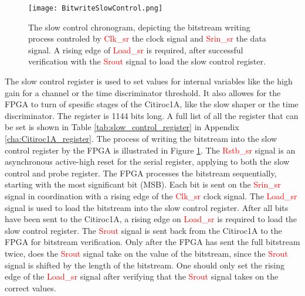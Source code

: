 \begin{figure}
    \centering
    \texttt{[image: BitwriteSlowControl.png]}
    \caption{The slow control chronogram, depicting the bitstream writing process controled by  \textcolor{red}{Clk\_sr} the clock signal and  \textcolor{red}{Srin\_sr} the data signal. A rising edge of \textcolor{red}{Load\_sr} is required,
     after successful verification with the \textcolor{red}{Srout} signal to load the slow control register. \autocite{datasheetCITIROC}}
    \label{fig:CITIROC1A_writing_bitstream}
\end{figure}
The slow control register is used to set values for internal variables like the high gain for a channel or the time discriminator threshold.
It also allowes for the FPGA to turn of spesific stages of the Citiroc1A, like the slow shaper or the time discriminator.
The register is 1144 bits long. A full list of all the register that can be set is shown in Table \ref{tab:slow_control_register} in Appendix \ref{cha:Citiroc1A_register}.
\newline
The process of writing the bitstream into the slow control register by the FPGA is illustrated in Figure \ref{fig:CITIROC1A_writing_bitstream}.
\newline
The \textcolor{red}{Rstb\_sr} signal is an asynchronous active-high reset for the serial register, applying to both the slow control and probe register. 
\newline
The FPGA processes the bitstream sequentially, starting with the most significant bit (MSB).
 Each bit is sent on the \textcolor{red}{Srin\_sr} signal in coordination with a rising edge of the \textcolor{red}{Clk\_sr} clock signal.
 \newline
    The \textcolor{red}{Load\_sr} signal is used to load the bitstream into the slow control register. After all bits have been sent to the Citiroc1A,
     a rising edge on \textcolor{red}{Load\_sr} is required to load the slow control register.
\newline
The \textcolor{red}{Srout} signal is sent back from the Citiroc1A to the FPGA for bitstream verification.
Only after the FPGA has sent the full bitstream twice, does the \textcolor{red}{Srout} signal take on the value of the bitstream, since the \textcolor{red}{Srout} signal is shifted by the length of the bitstream.\autocite{datasheetCITIROC}
One should only set the rising edge of the \textcolor{red}{Load\_sr} signal after verifying that the \textcolor{red}{Srout} signal takes on the correct values.

